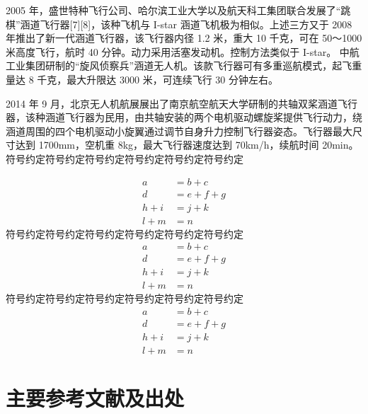 \begin{ubox}
2005 年，盛世特种飞行公司、哈尔滨工业大学以及航天科工集团联合发展了“跳棋”涵道飞行器[7][8]，该种飞机与 I-star 涵道飞机极为相似。上述三方又于 2008 年推出了新一代涵道飞行器，该飞行器内径 1.2 米，重大 10 千克，可在 50～1000 米高度飞行，航时 40 分钟。动力采用活塞发动机。控制方法类似于 I-star。
中航工业集团研制的“旋风侦察兵”涵道无人机。该款飞行器可有多重巡航模式，起飞重量达 8 千克，最大升限达 3000 米，可连续飞行 30 分钟左右。

2014 年 9 月，北京无人机航展展出了南京航空航天大学研制的共轴双桨涵道飞行器，该种涵道飞行器为民用，由共轴安装的两个电机驱动螺旋桨提供飞行动力，绕涵道周围的四个电机驱动小旋翼通过调节自身升力控制飞行器姿态。飞行器最大尺寸达到 1700mm，空机重 8kg，最大飞行器速度达到 70km/h，续航时间 20min。
符号约定符号约定符号约定符号约定符号约定符号约定
\begin{table}[H]
	\centering
	\small
	\caption{数值}
\end{table}
\begin{equation}
	\begin{aligned}
		a &= b + c \\
		d &= e + f + g \\
		h + i &= j + k \\
		l + m &= n
	\end{aligned}
\end{equation}
符号约定符号约定符号约定符号约定符号约定符号约定
\begin{equation}
	\begin{aligned}
		a &= b + c \\
		d &= e + f + g \\
		h + i &= j + k \\
		l + m &= n
	\end{aligned}
\end{equation}
符号约定符号约定符号约定符号约定符号约定符号约定
\begin{equation}
	\begin{aligned}
		a &= b + c \\
		d &= e + f + g \\
		h + i &= j + k \\
		l + m &= n
	\end{aligned}
\end{equation}
\section{主要参考文献及出处}
\end{ubox}

